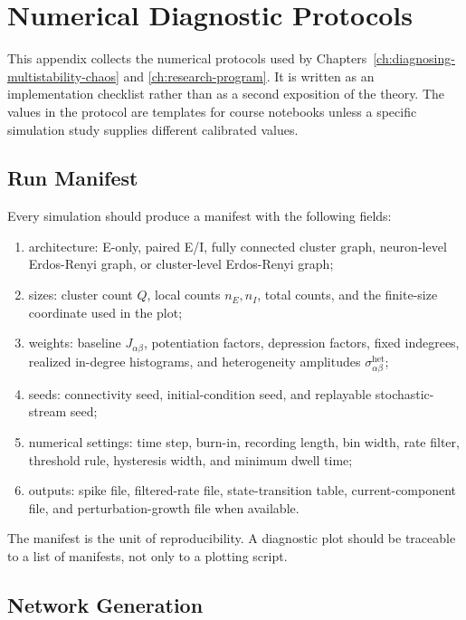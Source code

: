 \chapter{Numerical Diagnostic Protocols}
\label{app:numerical-diagnostic-protocols}

This appendix collects the numerical protocols used by
Chapters~\ref{ch:diagnosing-multistability-chaos} and
\ref{ch:research-program}. It is written as an implementation checklist rather
than as a second exposition of the theory. The values in the protocol are
templates for course notebooks unless a specific simulation study supplies
different calibrated values.

\section{Run Manifest}
\label{appC:run-manifest}

Every simulation should produce a manifest with the following fields:
\begin{enumerate}
    \item architecture: E-only, paired E/I, fully connected cluster graph,
    neuron-level Erdos-Renyi graph, or cluster-level Erdos-Renyi graph;
    \item sizes: cluster count \(Q\), local counts \(n_E,n_I\), total counts,
    and the finite-size coordinate used in the plot;
    \item weights: baseline \(J_{\alpha\beta}\), potentiation factors,
    depression factors, fixed indegrees, realized in-degree histograms, and
    heterogeneity amplitudes \(\sigma_{\alpha\beta}^{\mathrm{het}}\);
    \item seeds: connectivity seed, initial-condition seed, and replayable
    stochastic-stream seed;
    \item numerical settings: time step, burn-in, recording length, bin width,
    rate filter, threshold rule, hysteresis width, and minimum dwell time;
    \item outputs: spike file, filtered-rate file, state-transition table,
    current-component file, and perturbation-growth file when available.
\end{enumerate}
The manifest is the unit of reproducibility. A diagnostic plot should be
traceable to a list of manifests, not only to a plotting script.

\section{Network Generation}
\label{appC:network-generation}

